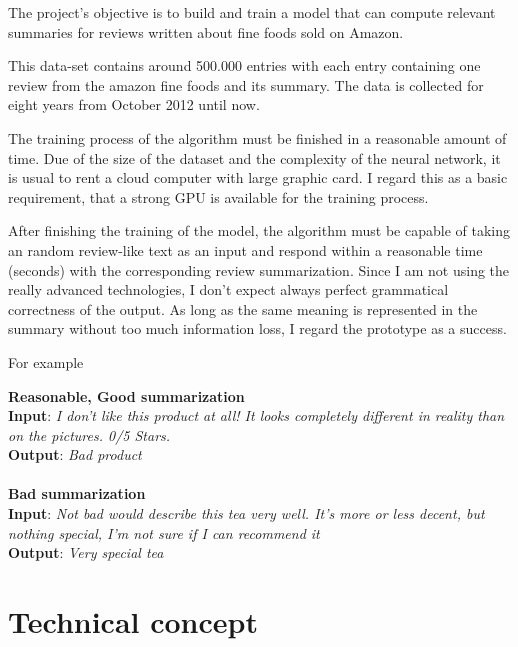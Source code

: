 The project's objective is to build and train a model that can compute relevant summaries for reviews written about fine foods sold on Amazon. 

This data-set contains around 500.000 entries with each entry containing one review from the amazon fine foods and its summary. The data is collected for eight years from October 2012 until now. 

The training process of the algorithm must be finished in a reasonable amount of time. Due of the size of the dataset and the complexity of the neural network, it is usual to rent a cloud computer with large graphic card. I regard this as a basic requirement, that a strong GPU is available for the training process. 

After finishing the training of the model, the algorithm must be capable of taking an random review-like text as an input and respond within a reasonable time (seconds) with the corresponding review summarization. Since I am not using the really advanced technologies, I don't expect always perfect grammatical correctness of the output. As long as the same meaning is represented in the summary without too much information loss, I regard the prototype as a success. 

For example

\begin{tcolorbox}
	\textbf{Reasonable, Good summarization} \\
	
		\textbf{Input}:
			\textit{I don't like this product at all! It looks completely different in reality than on the pictures. 0/5 Stars.} \\
			
		\textbf{Output}:
			\textit{Bad product} \\ \\
		
	\textbf{Bad summarization} \\
	
		\textbf{Input}:
		\textit{Not bad would describe this tea very well. It's more or less decent, but nothing special, I'm not sure if I can recommend it} \\
		
		\textbf{Output}:
		\textit{Very special tea}
	
\end{tcolorbox}



\section{Technical concept}\label{ss:tc}

